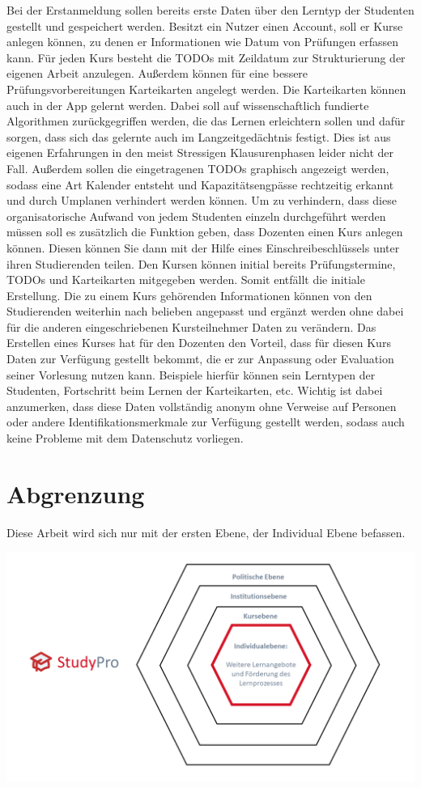 Bei der Erstanmeldung sollen bereits erste Daten über den Lerntyp der Studenten gestellt und gespeichert werden.
Besitzt ein Nutzer einen Account, soll er Kurse anlegen können, zu denen er Informationen wie Datum von Prüfungen erfassen kann.
Für jeden Kurs besteht die TODOs mit Zeildatum zur Strukturierung der eigenen Arbeit anzulegen.
Außerdem können für eine bessere Prüfungsvorbereitungen Karteikarten angelegt werden.
Die Karteikarten können auch in der App gelernt werden.
Dabei soll auf wissenschaftlich fundierte Algorithmen zurückgegriffen werden, die das Lernen erleichtern sollen und dafür sorgen, dass sich das gelernte auch im Langzeitgedächtnis festigt.
Dies ist aus eigenen Erfahrungen in den meist Stressigen Klausurenphasen leider nicht der Fall.
Außerdem sollen die eingetragenen TODOs graphisch angezeigt werden, sodass eine Art Kalender entsteht und Kapazitätsengpässe rechtzeitig erkannt und durch Umplanen verhindert werden können.
Um zu verhindern, dass diese organisatorische Aufwand von jedem Studenten einzeln durchgeführt werden müssen soll es zusätzlich die Funktion geben, dass Dozenten einen Kurs anlegen können.
Diesen können Sie dann mit der Hilfe eines Einschreibeschlüssels unter ihren Studierenden teilen.
Den Kursen können initial bereits Prüfungstermine, TODOs und Karteikarten mitgegeben werden.
Somit entfällt die initiale Erstellung.
Die zu einem Kurs gehörenden Informationen können von den Studierenden weiterhin nach belieben angepasst und ergänzt werden ohne dabei für die anderen eingeschriebenen Kursteilnehmer Daten zu verändern.
Das Erstellen eines Kurses hat für den Dozenten den Vorteil, dass für diesen Kurs Daten zur Verfügung gestellt bekommt, die er zur Anpassung oder Evaluation seiner Vorlesung nutzen kann.
Beispiele hierfür können sein Lerntypen der Studenten, Fortschritt beim Lernen der Karteikarten, etc.
Wichtig ist dabei anzumerken, dass diese Daten vollständig anonym ohne Verweise auf Personen oder andere Identifikationsmerkmale zur Verfügung gestellt werden, sodass auch keine Probleme mit dem Datenschutz vorliegen. 

\section{Abgrenzung}
Diese Arbeit wird sich nur mit der ersten Ebene, der Individual Ebene befassen. 

\includegraphics[width=\linewidth,keepaspectratio]{img/Ebenen}

